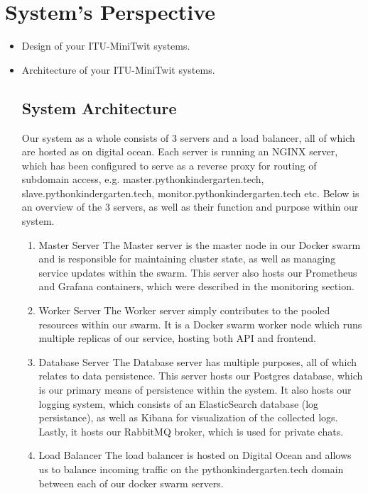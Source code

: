 \section{System's Perspective}

\begin{itemize}
  \item Design of your ITU-MiniTwit systems.
  \item Architecture of your ITU-MiniTwit systems.
  \subsection{System Architecture}
  Our system as a whole consists of 3 servers and a load balancer, all of which are hosted as on digital ocean.
  Each server is running an NGINX server, which has been configured to serve as a reverse proxy for routing of subdomain access, e.g. master.pythonkindergarten.tech, slave.pythonkindergarten.tech, monitor.pythonkindergarten.tech etc.
  \newline
  Below is an overview of the 3 servers, as well as their function and purpose within our system.\newline
  
  \begin{enumerate}
    \item Master Server\newline
    The Master server is the master node in our Docker swarm and is responsible for maintaining cluster state, as well as managing service updates within the swarm.
    This server also hosts our Prometheus and Grafana containers, which were described in the monitoring section.
    \item Worker Server\newline
    The Worker server simply contributes to the pooled resources within our swarm. 
    It is a Docker swarm worker node which runs multiple replicas of our service, hosting both API and frontend.

    \item Database Server\newline
    The Database server has multiple purposes, all of which relates to data persistence.
    This server hosts our Postgres database, which is our primary means of persistence within the system. 
    \newline
    It also hosts our logging system, which consists of an ElasticSearch database (log persistance), as well as Kibana for visualization of the collected logs.
    \newline
    Lastly, it hosts our RabbitMQ broker, which is used for private chats.
    \item Load Balancer\newline
    The load balancer is hosted on Digital Ocean and allows us to balance incoming traffic on the pythonkindergarten.tech domain between each of our docker swarm servers.
  \end{enumerate}


\end{itemize}
